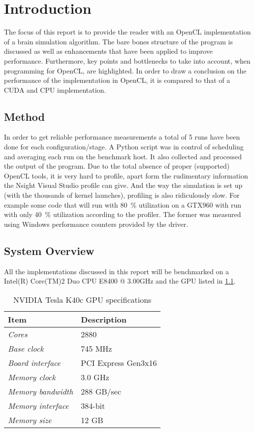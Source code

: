 \documentclass[final]{report}
\begin{document}
\chapter{Introduction}

The focus of this report is to provide the reader with an OpenCL implementation of a brain simulation algorithm.
The bare bones structure of the program is discussed as well as enhancements that have been applied to improve performance.
Furthermore, key points and bottlenecks to take into account, when programming for OpenCL, are highlighted. 
In order to draw a conclusion on the performance of the implementation in OpenCL, it is compared to that of a CUDA and CPU implementation.

\section{Method}
In order to get reliable performance measurements a total of 5 runs have been done for each configuration/stage.
A Python script was in control of scheduling and averaging each run on the benchmark host.
It also collected and processed the output of the program.
Due to the total absence of proper (supported) OpenCL tools, it is very hard to profile, apart form the rudimentary information the Nsight Visual Studio profile can give.
And the way the simulation is set up (with the thousands of kernel launches), profiling is also ridiculously slow.
For example some code that will run with \SI{80}{\percent} utilization on a GTX960 with run with only \SI{40}{\percent} utilization according to the profiler.
The former was measured using Windows performance counters provided by the driver.


\section{System Overview}
All the implementations discussed in this report will be benchmarked on a Intel(R) Core(TM)2 Duo CPU E8400 @ 3.00GHz and the GPU listed in \cref{tab:gpu-specs}.

\begin{table}[H]
	\centering
	\caption{NVIDIA Tesla K40c GPU specifications}
	\label{tab:gpu-specs}
	\begin{tabular}{ll}
		\toprule
			\textbf{Item} &\textbf{Description}\\
		\midrule
			\textit{Cores} & 2880	\\
			\textit{Base clock} & 745 MHz \\
			\textit{Board interface} & PCI Express Gen3x16 \\
			\textit{Memory clock} & 3.0 GHz \\
			\textit{Memory bandwidth} & 288 GB/sec \\
			\textit{Memory interface} & 384-bit \\
			\textit{Memory size} & 12 GB \\
		\bottomrule
	\end{tabular}
\end{table}
\end{document}
